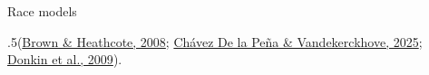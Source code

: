 \documentclass[ignorenonframetext,]{beamer}
\begin{document}
\begin{frame}{\color{darkblue}Race models}
\par\begin{spacing}{.5}\begingroup\tiny(\href{https://doi.org/10.1016/j.cogpsych.2007.12.002}{Brown \& Heathcote, 2008}; \href{https://doi.org/10.3758/s13423-025-02729-y}{Chávez De la Peña \& Vandekerckhove, 2025}; \href{https://www.researchgate.net/publication/277816660_Is_the_Linear_Ballistic_Accumulator_Model_Really_the_Simplest_Model_of_Choice_Response_Times_A_Bayesian_Model_Complexity_Analysis}{Donkin et al., 2009}).\endgroup\end{spacing}


\end{frame}
\end{document}
